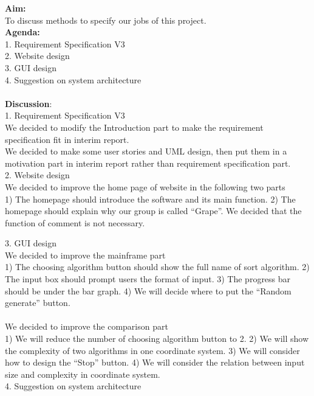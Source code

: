 \documentclass[paper=a4, fontsize=11pt,twoside]{scrartcl}		%
\begin{document}
\textbf{Aim:} \\
To discuss methods to specify our jobs of this project.\\

\textbf{Agenda:} \\
1.	Requirement Specification V3\\
2.	Website design\\
3.	GUI design\\
4.	Suggestion on system architecture\\\\


\textbf{Discussion}:\\
1.	Requirement Specification V3\\

	We decided to modify the Introduction part to make the requirement specification fit in interim report.\\
	We decided to make some user stories and UML design, then put them in a motivation part in interim report rather than requirement specification part.\\
    
2.	Website design\\

	We decided to improve the home page of website in the following two parts\\
1)	The homepage should introduce the software and its main function.
2)	The homepage should explain why our group is called “Grape”.
	We decided that the function of comment is not necessary.

3.	GUI design\\

	We decided to improve the mainframe part\\
1)	The choosing algorithm button should show the full name of sort algorithm.
2)	The input box should prompt users the format of input.
3)	The progress bar should be under the bar graph.
4)	We will decide where to put the “Random generate” button.\\\\
	We decided to improve the comparison part \\
1)	We will reduce the number of choosing algorithm button to 2.
2)	We will show the complexity of two algorithms in one coordinate system.
3)	We will consider how to design the “Stop” button.
4)	We will consider the relation between input size and complexity in coordinate system.\\


4.	Suggestion on system architecture\\
\end{document}
